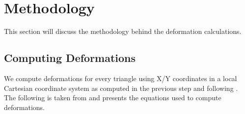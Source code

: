\documentclass{article}
\begin{document}
\section{Methodology}

    This section will discuss the methodology behind the deformation calculations.

    \subsection{Computing Deformations}

    We compute deformations for every triangle using X/Y coordinates in a local Cartesian coordinate system as computed in the previous step and following \citep{bouchat_reassessing_2020}. The following is taken from \citep{bouchat_reassessing_2020} and presents the equations used to compute deformations.
\end{document}
